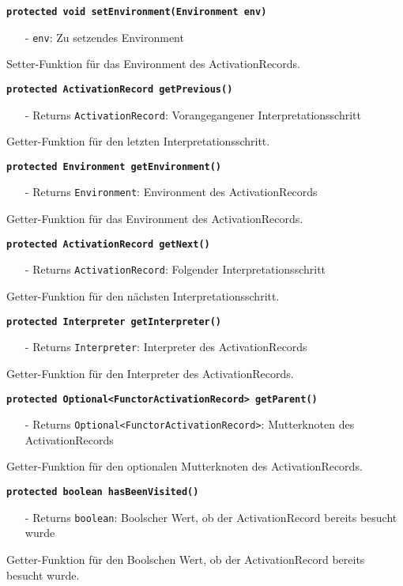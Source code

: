 \documentclass[parskip=full,11pt,twoside]{scrartcl}
\begin{document}
\textbf{\texttt{protected void setEnvironment(Environment env)}}
\begin{itemize}[noitemsep]
	\item[-] \texttt{env}: Zu setzendes Environment
\end{itemize}
Setter-Funktion für das Environment des ActivationRecords.

\textbf{\texttt{protected ActivationRecord getPrevious()}}
\begin{itemize}[noitemsep]
	\item[-] Returns \texttt{ActivationRecord}: Vorangegangener Interpretationsschritt
\end{itemize}
Getter-Funktion für den letzten Interpretationsschritt.

\textbf{\texttt{protected Environment getEnvironment()}}
\begin{itemize}[noitemsep]
	\item[-] Returns \texttt{Environment}: Environment des ActivationRecords
\end{itemize}
Getter-Funktion für das Environment des ActivationRecords.

\textbf{\texttt{protected ActivationRecord getNext()}}
\begin{itemize}[noitemsep]
	\item[-] Returns \texttt{ActivationRecord}: Folgender Interpretationsschritt
\end{itemize}
Getter-Funktion für den nächsten Interpretationsschritt.

\textbf{\texttt{protected Interpreter getInterpreter()}}
\begin{itemize}[noitemsep]
	\item[-] Returns \texttt{Interpreter}: Interpreter des ActivationRecords
\end{itemize}
Getter-Funktion für den Interpreter des ActivationRecords.

\textbf{\texttt{protected Optional<FunctorActivationRecord> getParent()}}
\begin{itemize}[noitemsep]
	\item[-] Returns \texttt{Optional<FunctorActivationRecord>}: Mutterknoten des ActivationRecords
\end{itemize}
Getter-Funktion für den optionalen Mutterknoten des ActivationRecords.

\textbf{\texttt{protected boolean hasBeenVisited()}}
\begin{itemize}[noitemsep]
	\item[-] Returns \texttt{boolean}: Boolscher Wert, ob der ActivationRecord bereits besucht wurde
\end{itemize}
Getter-Funktion für den Boolschen Wert, ob der ActivationRecord bereits besucht wurde.
\end{document}
